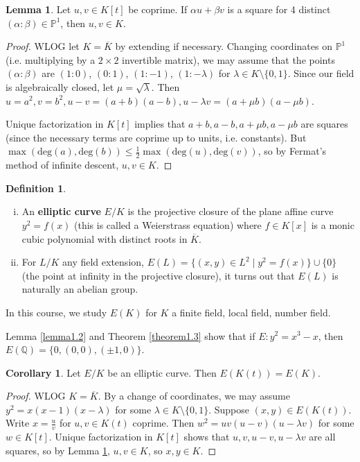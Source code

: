 \documentclass{article}
\theoremstyle{definition}
\newtheorem{lemma}[theorem]{Lemma}
\newtheorem{cor}[theorem]{Corollary}
\newtheorem{defn}{Definition}[section]
\begin{document}
\begin{lemma}\label{lemma1.4}
    Let $u,v \in K[t]$ be coprime. If $\alpha u + \beta v$ is a square for 4 distinct $(\alpha : \beta) \in \mathbb{P}^1$, then $u, v \in K$.
\end{lemma}
\begin{proof}
    WLOG let $K = \overline{K}$ by extending if necessary. Changing coordinates on $\mathbb{P}^1$ (i.e. multiplying by a $2 \times 2$ invertible matrix), we may assume that the points $(\alpha : \beta)$ are $(1 : 0)$, $(0 : 1)$, $(1: -1)$, $(1: - \lambda)$ for $\lambda \in K \setminus \{0,1\}$. Since our field is algebraically closed, let $\mu = \sqrt{\lambda}$. Then $u = a^2, v = b^2, u-v = (a+b)(a-b), u - \lambda v = (a + \mu b)(a - \mu b)$.
    \vspace{1mm}
     
    Unique factorization in $K[t]$ implies that $a+b, a-b, a+ \mu b, a- \mu b$ are squares (since the necessary terms are coprime up to units, i.e. constants). But $\max(\text{deg}(a), \text{deg}(b)) \le \frac{1}{2}\max(\text{deg}(u),\text{deg}(v))$, so by Fermat's method of infinite descent, $u, v \in K$.
\end{proof}
\begin{defn}
    \begin{enumerate}[(i)]
        \item An \textbf{elliptic curve} $E/K$ is the projective closure of the plane affine curve $y^2 = f(x)$ (this is called a Weierstrass equation) where $f \in K[x]$ is a monic cubic polynomial with distinct roots in $\overline{K}$.
        \item For $L/K$ any field extension, $E(L) = \{(x,y) \in L^2 \mid y^2 = f(x)\} \cup \{0\}$ (the point at infinity in the projective closure), it turns out that $E(L)$ is naturally an abelian group.  
    \end{enumerate}
\end{defn}
In this course, we study $E(K)$ for $K$ a finite field, local field, number field.
\vspace{1mm}
 
Lemma \ref{lemma1.2} and Theorem \ref{theorem1.3} show that if $E : y^2 = x^3-x$, then $E(\mathbb{Q}) = \{0, (0,0), (\pm 1, 0)\}$.

\begin{cor}\label{cor1.5}
    Let $E/K$ be an elliptic curve. Then $E(K(t)) = E(K)$.
\end{cor}
\begin{proof}
    WLOG $K = \overline{K}$. By a change of coordinates, we may assume $y^2 = x(x-1)(x-\lambda)$ for some $\lambda \in K\setminus \{0,1\}$. Suppose $(x,y) \in E(K(t))$. Write $x = \frac{u}{v}$ for $u,v \in K(t)$ coprime. Then $w^2 = uv(u-v)(u-\lambda v)$ for some $w \in K[t]$. Unique factorization in $K[t]$ shows that $u,v, u-v, u- \lambda v$ are all squares, so by Lemma \ref{lemma1.4}, $u, v \in K$, so $x, y \in K$.
\end{proof}
\end{document}
